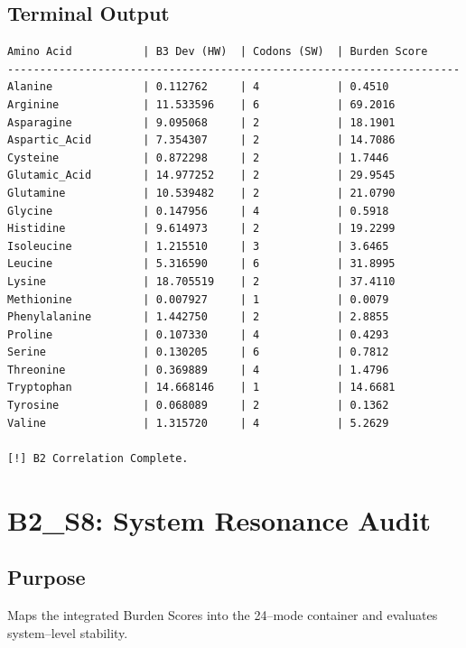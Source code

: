 \documentclass[11pt, letterpaper, openany]{book}
\begin{document}
\subsection*{Terminal Output}
\begin{lstlisting}[language=terminal]
Amino Acid           | B3 Dev (HW)  | Codons (SW)  | Burden Score
----------------------------------------------------------------------
Alanine              | 0.112762     | 4            | 0.4510
Arginine             | 11.533596    | 6            | 69.2016
Asparagine           | 9.095068     | 2            | 18.1901
Aspartic_Acid        | 7.354307     | 2            | 14.7086
Cysteine             | 0.872298     | 2            | 1.7446
Glutamic_Acid        | 14.977252    | 2            | 29.9545
Glutamine            | 10.539482    | 2            | 21.0790
Glycine              | 0.147956     | 4            | 0.5918
Histidine            | 9.614973     | 2            | 19.2299
Isoleucine           | 1.215510     | 3            | 3.6465
Leucine              | 5.316590     | 6            | 31.8995
Lysine               | 18.705519    | 2            | 37.4110
Methionine           | 0.007927     | 1            | 0.0079
Phenylalanine        | 1.442750     | 2            | 2.8855
Proline              | 0.107330     | 4            | 0.4293
Serine               | 0.130205     | 6            | 0.7812
Threonine            | 0.369889     | 4            | 1.4796
Tryptophan           | 14.668146    | 1            | 14.6681
Tyrosine             | 0.068089     | 2            | 0.1362
Valine               | 1.315720     | 4            | 5.2629

[!] B2 Correlation Complete.
\end{lstlisting}


\section{B2\_S8: System Resonance Audit}
\subsection*{Purpose}
Maps the integrated Burden Scores into the 24–mode container and evaluates
system–level stability.
\end{document}
